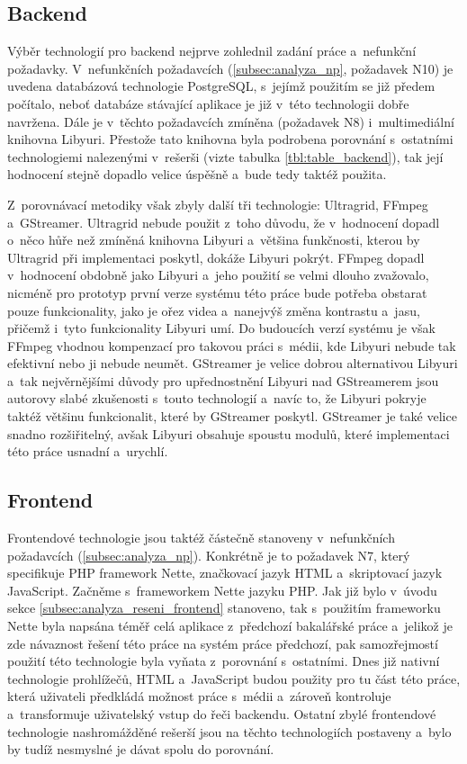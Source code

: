 \documentclass[thesis=M,czech]{FITthesis}[2012/06/26]
\begin{document}
\subsection{Backend} \label{subsec:analyza_technologie_vybrane_backend}
Výběr technologií pro backend nejprve zohlednil zadání práce a~nefunkční požadavky. V~nefunkčních požadavcích (\ref{subsec:analyza_np}, požadavek N10) je uvedena databázová technologie PostgreSQL, s~jejímž použitím se již předem počítalo, neboť databáze stávající aplikace je již v~této technologii dobře navržena. Dále je v~těchto požadavcích zmíněna (požadavek N8) i~multimediální knihovna Libyuri. Přestože tato knihovna byla podrobena porovnání s~ostatními technologiemi nalezenými v~rešerši (vizte tabulka \ref{tbl:table_backend}), tak její hodnocení stejně dopadlo velice úspěšně a~bude tedy taktéž použita. 

Z~porovnávací metodiky však zbyly další tři technologie: Ultragrid, FFmpeg a~GStreamer. Ultragrid nebude použit z~toho důvodu, že v~hodnocení dopadl o~něco hůře než zmíněná knihovna Libyuri a~většina funkčnosti, kterou by Ultragrid při implementaci poskytl, dokáže Libyuri pokrýt. FFmpeg dopadl v~hodnocení obdobně jako Libyuri a~jeho použití se velmi dlouho zvažovalo, nicméně pro prototyp první verze systému této práce bude potřeba obstarat pouze funkcionality, jako je ořez videa a~nanejvýš změna kontrastu a~jasu, přičemž i~tyto funkcionality Libyuri umí. Do budoucích verzí systému je však FFmpeg vhodnou kompenzací pro takovou práci s~médii, kde Libyuri nebude tak efektivní nebo ji nebude neumět. GStreamer je velice dobrou alternativou Libyuri a~tak nejvěrnějšími důvody pro upřednostnění Libyuri nad GStreamerem jsou autorovy slabé zkušenosti s~touto technologií a~navíc to, že Libyuri pokryje taktéž většinu funkcionalit, které by GStreamer poskytl. GStreamer je také velice snadno rozšiřitelný, avšak Libyuri obsahuje spoustu modulů, které implementaci této práce usnadní a~urychlí.

\subsection{Frontend} \label{subsec:analyza_technologie_vybrane_frontend}
Frontendové technologie jsou taktéž částečně stanoveny v~nefunkčních požadavcích (\ref{subsec:analyza_np}). Konkrétně je to požadavek N7, který specifikuje PHP framework Nette, značkovací jazyk HTML a~skriptovací jazyk JavaScript. Začněme s~frameworkem Nette jazyku PHP. Jak již bylo v~úvodu sekce \ref{subsec:analyza_reseni_frontend} stanoveno, tak s~použitím frameworku Nette byla napsána téměř celá aplikace z~předchozí bakalářské práce a~jelikož je zde návaznost řešení této práce na systém práce předchozí, pak samozřejmostí použití této technologie byla vyňata z~porovnání s~ostatními. Dnes již nativní technologie prohlížečů, HTML a~JavaScript budou použity pro tu část této práce, která uživateli předkládá možnost práce s~médii a~zároveň kontroluje a~transformuje uživatelský vstup do řeči backendu. Ostatní zbylé frontendové technologie nashromážděné rešerší jsou na těchto technologiích postaveny a~bylo by tudíž nesmyslné je dávat spolu do porovnání. 
\end{document}
